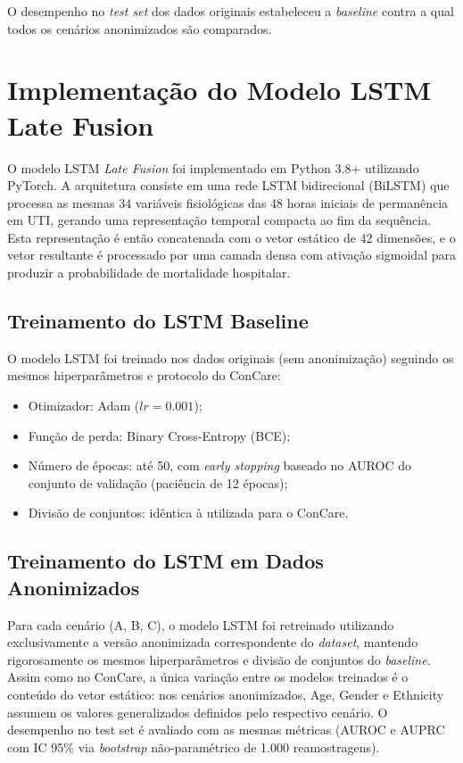 O desempenho no \textit{test set} dos dados originais estabeleceu a \textit{baseline} contra a qual todos os cenários anonimizados são comparados.

\section{Implementação do Modelo LSTM Late Fusion}
\label{sec:dev-lstm}

O modelo LSTM \textit{Late Fusion} foi implementado em Python 3.8+ utilizando PyTorch. A arquitetura consiste em uma rede LSTM bidirecional (BiLSTM) que processa as mesmas 34 variáveis fisiológicas das 48 horas iniciais de permanência em UTI, gerando uma representação temporal compacta ao fim da sequência. Esta representação é então concatenada com o vetor estático de 42 dimensões, e o vetor resultante é processado por uma camada densa com ativação sigmoidal para produzir a probabilidade de mortalidade hospitalar.

\subsection{Treinamento do LSTM Baseline}
O modelo LSTM foi treinado nos dados originais (sem anonimização) seguindo os mesmos hiperparâmetros e protocolo do ConCare:
\begin{itemize}
    \item Otimizador: Adam ($lr=0.001$);
    \item Função de perda: Binary Cross-Entropy (BCE);
    \item Número de épocas: até 50, com \textit{early stopping} baseado no AUROC do conjunto de validação (paciência de 12 épocas);
    \item Divisão de conjuntos: idêntica à utilizada para o ConCare.
\end{itemize}

\subsection{Treinamento do LSTM em Dados Anonimizados}
Para cada cenário (A, B, C), o modelo LSTM foi retreinado utilizando exclusivamente a versão anonimizada correspondente do \textit{dataset}, mantendo rigorosamente os mesmos hiperparâmetros e divisão de conjuntos do \textit{baseline}. Assim como no ConCare, a única variação entre os modelos treinados é o conteúdo do vetor estático: nos cenários anonimizados, Age, Gender e Ethnicity assumem os valores generalizados definidos pelo respectivo cenário. O desempenho no test set é avaliado com as mesmas métricas (AUROC e AUPRC com IC 95\% via \textit{bootstrap} não-paramétrico de 1.000 reamostragens).

